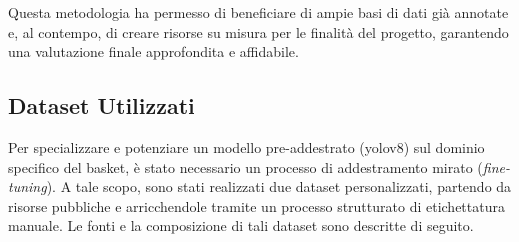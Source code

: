 \documentclass[12pt,a4paper,openright,twoside]{book}
\begin{document}
Questa metodologia ha permesso di beneficiare di ampie basi di 
dati già annotate e, al contempo, di creare risorse su misura 
per le finalità del progetto, garantendo una valutazione finale 
approfondita e affidabile.

\subsection{Dataset Utilizzati}
\label{sec:dataset-utilizzati}

\noindent Per specializzare e potenziare un modello pre-addestrato 
(\ac{yolo}v8) sul dominio specifico del basket, è stato necessario un 
processo di addestramento mirato (\emph{fine-tuning}). A tale scopo, 
sono stati realizzati due dataset personalizzati, partendo da risorse 
pubbliche e arricchendole tramite un processo strutturato di etichettatura 
manuale. Le fonti e la composizione di tali dataset sono descritte di seguito.
\end{document}
